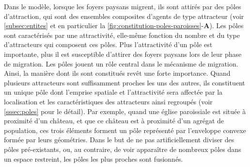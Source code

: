 \begin{tcolorbox}[breakable,left=0pt,right=0pt,top=0pt,bottom=0pt,
	colback=gray!15,colframe=gray!15,width=\dimexpr\textwidth\relax, 
	enlarge left by=0mm, boxsep=5pt,arc=0pt,outer arc=0pt]
	
Dans le modèle, lorsque les foyers paysans migrent, ils sont attirés par des pôles d'attraction, qui sont des ensembles composites d'agents de type attracteur (voir \cref{subsec:entites} et en particulier la \cref{fig:constitution-poles-paroisses}-\textbf{A}).
Les pôles sont caractérisés par une attractivité, elle-même fonction du nombre et du type d'attracteurs qui composent ces pôles.
Plus l'attractivité d'un pôle est importante, plus il est susceptible d'attirer des foyers paysans lors de leur phase de migration.
Les pôles jouent un rôle central dans le mécanisme de migration.
Ainsi, la manière dont ils sont constitués revêt une forte importance.
Quand plusieurs attracteurs sont suffisamment proches les uns des autres, ils constituent un unique pôle dont l'emprise spatiale et l'attractivité sera affectée par la localisation et les caractéristiques des attracteurs ainsi regroupés (voir \cref{sssec:poles} pour le détail).
Par exemple, quand une église paroissiale est située à proximité\footnotemark{} d'un château, et que ce château est à proximité d'un agrégat de population, ces trois éléments forment un pôle représenté par l'enveloppe convexe formée par leurs géométries.
Dans le but de ne pas artificiellement diviser des pôles pré-existants, ou, au contraire, de voir apparaître de nombreux pôles dans un espace restreint, les pôles les plus proches sont fusionnés.
\end{tcolorbox}
%
%

